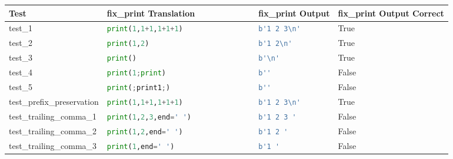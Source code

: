 \begin{table*}[ht]
    \centering
    \begin{tabular}{@{}l|lll@{}}
    \toprule
    Test                                  & fix\_print Translation             & fix\_print Output             & fix\_print Output Correct \\ \midrule
    test\_1                               & \lstinline[language=Python, style=pythonstyle]|print(1,1+1,1+1+1)                | & \lstinline[language=Python, style=pythonstyle]|b'1 2 3\n'    | & True                      \\
    test\_2                               & \lstinline[language=Python, style=pythonstyle]|print(1,2)                        | & \lstinline[language=Python, style=pythonstyle]|b'1 2\n'      | & True                      \\
    test\_3                               & \lstinline[language=Python, style=pythonstyle]|print()                           | & \lstinline[language=Python, style=pythonstyle]|b'\n'         | & True                      \\
    test\_4                               & \lstinline[language=Python, style=pythonstyle]|print(1;print)                    | & \lstinline[language=Python, style=pythonstyle]|b''           |                & False                     \\
    test\_5                               & \lstinline[language=Python, style=pythonstyle]|print(;print1;)                   | & \lstinline[language=Python, style=pythonstyle]|b''           |                & False                     \\
    test\_prefix\_preservation            & \lstinline[language=Python, style=pythonstyle]|print(1,1+1,1+1+1)                | & \lstinline[language=Python, style=pythonstyle]|b'1 2 3\n'    | & True                      \\
    test\_trailing\_comma\_1              & \lstinline[language=Python, style=pythonstyle]|print(1,2,3,end=' ')              | & \lstinline[language=Python, style=pythonstyle]|b'1 2 3 '     |                & False                     \\
    test\_trailing\_comma\_2              & \lstinline[language=Python, style=pythonstyle]|print(1,2,end=' ')                | & \lstinline[language=Python, style=pythonstyle]|b'1 2 '       |                & False                     \\
    test\_trailing\_comma\_3              & \lstinline[language=Python, style=pythonstyle]|print(1,end=' ')                  | & \lstinline[language=Python, style=pythonstyle]|b'1 '         |                & False                     \\

\end{tabular}
\end{table*}
